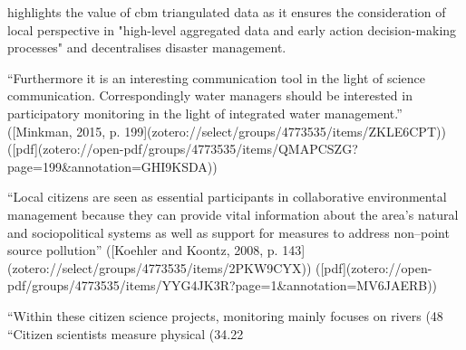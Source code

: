 {\autocite[20]{gualazziniEWEAEarlyWarning2021} highlights the value of \acrshort{cbm} triangulated data as it ensures the consideration of local perspective in "high-level aggregated data and early action decision-making processes" and decentralises disaster management. 


“Furthermore it is an interesting communication tool in the light of science communication. Correspondingly water managers should be interested in participatory monitoring in the light of integrated water management.” ([Minkman, 2015, p. 199](zotero://select/groups/4773535/items/ZKLE6CPT)) ([pdf](zotero://open-pdf/groups/4773535/items/QMAPCSZG?page=199&annotation=GHI9KSDA))


“Local citizens are seen as essential participants in collaborative environmental management because they can provide vital information about the area’s natural and sociopolitical systems as well as support for measures to address non–point source pollution” ([Koehler and Koontz, 2008, p. 143](zotero://select/groups/4773535/items/2PKW9CYX)) ([pdf](zotero://open-pdf/groups/4773535/items/YYG4JK3R?page=1&annotation=MV6JAERB))


“Within these citizen science projects, monitoring mainly focuses on rivers (48%
“Citizen scientists measure physical (34.22%

}
